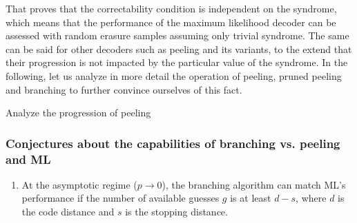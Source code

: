 \documentclass{article}
\begin{document}
That proves that the correctability condition is independent on the syndrome, which means that the performance of the maximum likelihood decoder can be assessed with random erasure samples assuming only trivial syndrome. The same can be said for other decoders such as peeling and its variants, to the extend that their progression is not impacted by the particular value of the syndrome. In the following, let us analyze in more detail the operation of peeling, pruned peeling and branching to further convince ourselves of this fact. 

{\color{red} Analyze the progression of peeling}

\subsubsection{Conjectures about the capabilities of branching vs. peeling and ML}

\begin{enumerate}
    \item At the asymptotic regime ($p \rightarrow 0$), the branching algorithm can match ML's performance if the number of available guesses $g$ is at least $d - s$, where $d$ is the code distance and $s$ is the stopping distance. 
\end{enumerate}
\end{document}
